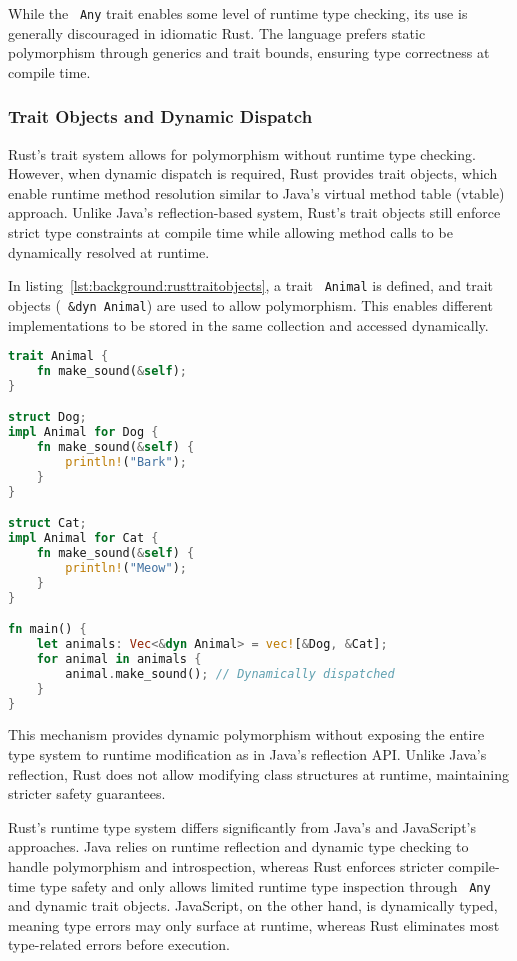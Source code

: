 While the ~\lstinline|Any| trait enables some level of runtime type checking, its use is generally discouraged in idiomatic Rust. The language prefers static polymorphism through generics and trait bounds, ensuring type correctness at compile time.

\subsubsection{Trait Objects and Dynamic Dispatch}

Rust’s trait system allows for polymorphism without runtime type checking. However, when dynamic dispatch is required, Rust provides trait objects, which enable runtime method resolution similar to Java’s virtual method table (vtable) approach. Unlike Java’s reflection-based system, Rust’s trait objects still enforce strict type constraints at compile time while allowing method calls to be dynamically resolved at runtime.

In listing~\ref{lst:background:rusttraitobjects}, a trait ~\lstinline|Animal| is defined, and trait objects (~\lstinline|&dyn Animal|) are used to allow polymorphism. This enables different implementations to be stored in the same collection and accessed dynamically.

\begin{lstlisting}[language=Rust,caption=Trait objects and dynamic dispatch in Rust,label=lst:background:rusttraitobjects]
trait Animal {
	fn make_sound(&self);
}

struct Dog;
impl Animal for Dog {
	fn make_sound(&self) {
		println!("Bark");
	}
}

struct Cat;
impl Animal for Cat {
	fn make_sound(&self) {
		println!("Meow");
	}
}

fn main() {
	let animals: Vec<&dyn Animal> = vec![&Dog, &Cat];
	for animal in animals {
		animal.make_sound(); // Dynamically dispatched
	}
}
\end{lstlisting}

This mechanism provides dynamic polymorphism without exposing the entire type system to runtime modification as in Java’s reflection API. Unlike Java’s reflection, Rust does not allow modifying class structures at runtime, maintaining stricter safety guarantees.

Rust’s runtime type system differs significantly from Java’s and JavaScript’s approaches. Java relies on runtime reflection and dynamic type checking to handle polymorphism and introspection, whereas Rust enforces stricter compile-time type safety and only allows limited runtime type inspection through ~\lstinline|Any| and dynamic trait objects. JavaScript, on the other hand, is dynamically typed, meaning type errors may only surface at runtime, whereas Rust eliminates most type-related errors before execution.


